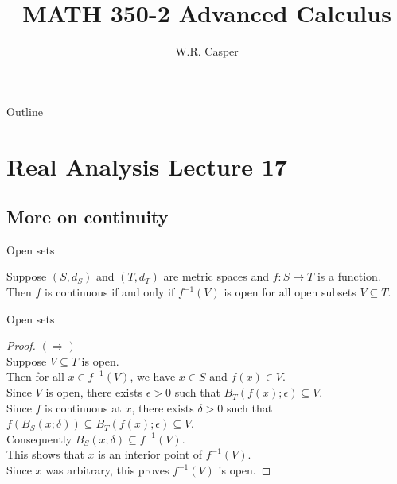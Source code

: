 \documentclass{beamer}
\title{MATH 350-2 Advanced Calculus}
\subtitle
{} %
\author[W.R. Casper] %
{W.R. Casper}
\institute[California State University Fullerton] %
{
  Department of Mathematics\\
  California State University Fullerton}
\begin{document}
\begin{frame}
  \titlepage
\end{frame}

\begin{frame}{Outline}
  \tableofcontents
\end{frame}



\section{Real Analysis Lecture 17}

\subsection{More on continuity}

\begin{frame}{Open sets}
\begin{thm}
Suppose $(S,d_S)$ and $(T,d_T)$ are metric spaces and $f: S\rightarrow T$ is a function.\\
\pause
Then $f$ is continuous if and only if $f^{-1}(V)$ is open for all open subsets $V\subseteq T$.
\end{thm}
\end{frame}

\begin{frame}{Open sets}
\begin{proof}
\pause
$(\Rightarrow)$\\
\pause
Suppose $V\subseteq T$ is open.\\
\pause
Then for all $x\in f^{-1}(V)$, we have $x\in S$ and $f(x)\in V$.\\
\pause
Since $V$ is open, there exists $\epsilon > 0$ such that $B_T(f(x);\epsilon)\subseteq V$.\\
\pause
Since $f$ is continuous at $x$, there exists $\delta > 0$ such that $f(B_S(x;\delta))\subseteq B_T(f(x);\epsilon)\subseteq V$.\\
\pause
Consequently $B_S(x;\delta)\subseteq f^{-1}(V)$.\\
\pause
This shows that $x$ is an interior point of $f^{-1}(V)$.\\
\pause
Since $x$ was arbitrary, this proves $f^{-1}(V)$ is open.
\end{proof}
\end{frame}
\end{document}
